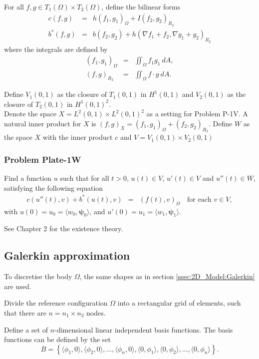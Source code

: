 \documentclass[../../main.tex]{subfiles}
\begin{document}
For all $f,g \in T_1(\Omega)\times T_2(\Omega) $, define the bilinear forms
\begin{eqnarray*}
	c(f,g) & = & h(f_1,g_1)_{\Omega} + I(f_2,g_2)_{R_2} \\
	b^*(f,g) & = & b(f_2,g_2) + h(\nabla f_1 + f_2, \nabla g_1 + g_2)_{R_2}
\end{eqnarray*}
where the integrals are defined by
\begin{eqnarray*}
	(f_1,g_1)_{\Omega} & = & \iint_\Omega f_1 g_1 \ dA,\\
	(f,g)_{R_2} & = & \iint_\Omega f \cdot g \ dA.
\end{eqnarray*}

Define $V_1(0,1)$ as the closure of $T_1(0,1)$ in $H^1(0,1)$ and $V_2(0,1)$ as the closure of $T_2(0,1)$ in $H^1(0,1)^2$.\\

Denote the space $X = L^2(0,1)\times L^2(0,1)^2$ as a setting for Problem P-1V. A natural inner product for $X$ is $(f,g)_X = (f_1,g_1)_{\Omega} + (f_2,g_2)_{R_2}$.  Define $W$ as the space $X$ with the inner product $c$ and $V = V_1(0,1) \times V_2(0,1)$

\subsubsection{Problem Plate-1W}
Find a function $u$ such that for all $t>0$, $u(t) \in V$, $u'(t) \in V$ and $u''(t) \in W$, satisfying the following equation
\begin{eqnarray}
	c(u''(t),v) + b^*(u(t),v) & = & (f(t),v)_{\Omega} \ \ \ \textrm{ for each } v \in V,
\end{eqnarray} with $u(0)= u_0 = \langle w_0, \boldsymbol\psi_0 \rangle$, and $u'(0)= u_1 = \langle w_1, \boldsymbol\psi_1 \rangle$.

See Chapter 2 for the existence theory.

\subsection{Galerkin approximation}
To discretise the body $\Omega$, the same shapes as in section \ref{ssec:2D_Model:Galerkin} are used.

Divide the reference configuration $\Omega$ into a rectangular grid of elements, such that there are $n = n_1 \times n_2$ nodes.

Define a set of $n$-dimensional linear independent basis functions. The basis functions can be defined by the set $$B = \left\{\langle\phi_1, 0\rangle, \langle\phi_2, 0\rangle,...,\langle\phi_{n}, 0 \rangle,\langle 0,\phi_1\rangle,\langle 0 ,\phi_2\rangle,...,\langle 0,\phi_{n}\rangle \right\}.$$ 
\end{document}

